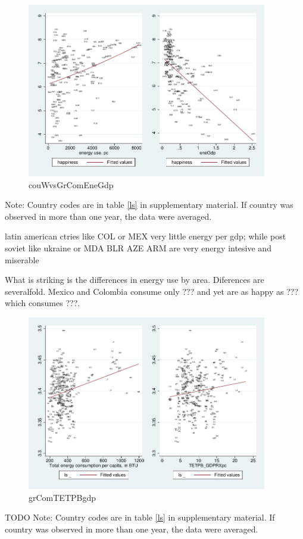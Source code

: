 \documentclass[10pt, letterpaper]{article}
\begin{document}
\begin{spacing}{1.4}
\begin{figure}[H]
 \includegraphics[height=3in]{graphsAndTables/couWvsGrComEneGdp.pdf}\centering
\caption{couWvsGrComEneGdp}\label{couWvsGrComEneGdp}
\end{figure}
{\scriptsize Note: Country codes are in table \ref{ls} in supplementary
  material. If country was observed in more than one year, the data were averaged.}

latin american ctries like COL or MEX very little energy per gdp; while post
soviet like ukraine or MDA BLR AZE ARM are very energy intesive and miserable

What is striking is the differences in energy use by area. Diferences are
severalfold. Mexico and Colombia
consume only ??? and yet are as happy as ??? which consumes ???.

\begin{figure}[H]
 \includegraphics[height=3in]{graphsAndTables/grComTETPB_gdp.pdf}\centering
\caption{grComTETPBgdp}\label{grComTETPBgdp}
\end{figure}
{\scriptsize TODO Note: Country codes are in table \ref{ls} in supplementary
  material. If country was observed in more than one year, the data were averaged.}


\end{spacing}
\end{document}

